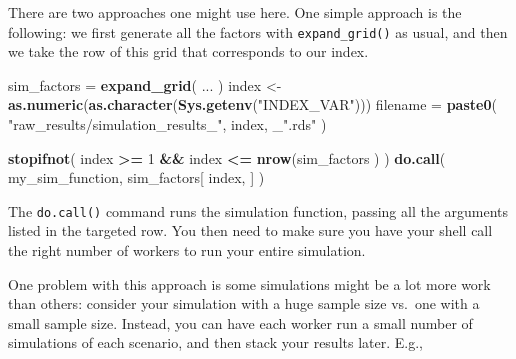 \documentclass[
]{book}
\newenvironment{Shaded}{\begin{snugshade}}{\end{snugshade}}
\newcommand{\DecValTok}[1]{\textcolor[rgb]{0.00,0.00,0.81}{#1}}
\newcommand{\FunctionTok}[1]{\textcolor[rgb]{0.13,0.29,0.53}{\textbf{#1}}}
\newcommand{\NormalTok}[1]{#1}
\newcommand{\OtherTok}[1]{\textcolor[rgb]{0.56,0.35,0.01}{#1}}
\newcommand{\SpecialCharTok}[1]{\textcolor[rgb]{0.81,0.36,0.00}{\textbf{#1}}}
\newcommand{\StringTok}[1]{\textcolor[rgb]{0.31,0.60,0.02}{#1}}
\begin{document}
There are two approaches one might use here.
One simple approach is the following: we first generate all the factors with \texttt{expand\_grid()} as usual, and then we take the row of this grid that corresponds to our index.

\begin{Shaded}
\begin{Highlighting}[]
\NormalTok{sim\_factors }\OtherTok{=} \FunctionTok{expand\_grid}\NormalTok{( ... )}
\NormalTok{index }\OtherTok{\textless{}{-}} \FunctionTok{as.numeric}\NormalTok{(}\FunctionTok{as.character}\NormalTok{(}\FunctionTok{Sys.getenv}\NormalTok{(}\StringTok{"INDEX\_VAR"}\NormalTok{)))}
\NormalTok{filename }\OtherTok{=} \FunctionTok{paste0}\NormalTok{( }\StringTok{"raw\_results/simulation\_results\_"}\NormalTok{, index, \_}\StringTok{".rds"}\NormalTok{ )}

\FunctionTok{stopifnot}\NormalTok{( index }\SpecialCharTok{\textgreater{}=} \DecValTok{1} \SpecialCharTok{\&\&}\NormalTok{ index }\SpecialCharTok{\textless{}=} \FunctionTok{nrow}\NormalTok{(sim\_factors ) )}
\FunctionTok{do.call}\NormalTok{( my\_sim\_function, sim\_factors[ index, ] )}
\end{Highlighting}
\end{Shaded}

The \texttt{do.call()} command runs the simulation function, passing all the arguments listed in the targeted row.
You then need to make sure you have your shell call the right number of workers to run your entire simulation.

One problem with this approach is some simulations might be a lot more work than others: consider your simulation with a huge sample size vs.~one with a small sample size.
Instead, you can have each worker run a small number of simulations of each scenario, and then stack your results later.
E.g.,

\begin{Shaded}
\end{Shaded}
\end{document}

